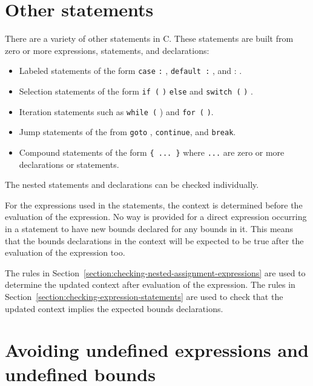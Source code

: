 \section{Other statements}

There are a variety of other statements in C. These statements are built
from zero or more expressions, statements, and declarations:

\begin{itemize}
\item
  Labeled statements of the form \texttt{case}
   \texttt{:} ,
  \texttt{default :} , and  :
  .
\item
  Selection statements of the form \texttt{if (}
  \texttt{)}  \texttt{else}
   and \texttt{switch (}  \texttt{)}
  .
\item
  Iteration statements such as \texttt{while (}  )
   and \texttt{for
  (}
  \texttt{)}.
\item
  Jump statements of the from \texttt{goto} ,
  \texttt{continue}, and \texttt{break}.
\item
  Compound statements of the form \texttt{\{ ... \}} where \texttt{...}
  are zero or more declarations or statements.
\end{itemize}

The nested statements and declarations can be checked individually.

For the expressions used in the statements, the context is determined
before the evaluation of the expression. No way is provided for a direct
expression occurring in a statement to have new bounds declared for any
bounds in it. This means that the bounds declarations in the context
will be expected to be true after the evaluation of the expression too.

The rules in Section~\ref{section:checking-nested-assignment-expressions}
are used to determine the updated context after evaluation of the
expression. The rules in Section~\ref{section:checking-expression-statements}
are used to check that the updated
context implies the expected bounds declarations.

\section{Avoiding undefined expressions and undefined bounds}
\label{section:avoiding-undefinedness}

